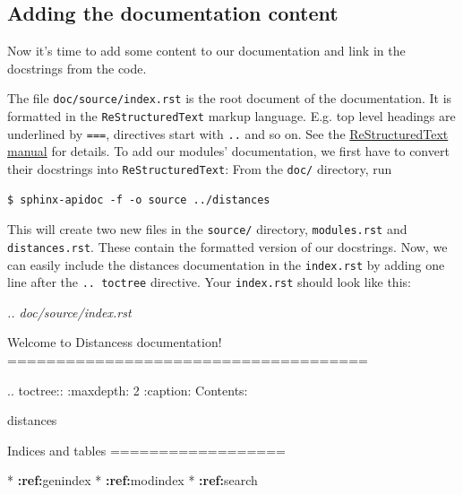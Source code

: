\documentclass[11pt]{article}
\newenvironment{Shaded}{}{}
\newcommand{\KeywordTok}[1]{\textcolor[rgb]{0.00,0.44,0.13}{\textbf{{#1}}}}
\newcommand{\DataTypeTok}[1]{\textcolor[rgb]{0.56,0.13,0.00}{{#1}}}
\newcommand{\DecValTok}[1]{\textcolor[rgb]{0.25,0.63,0.44}{{#1}}}
\newcommand{\CommentTok}[1]{\textcolor[rgb]{0.38,0.63,0.69}{\textit{{#1}}}}
\newcommand{\FunctionTok}[1]{\textcolor[rgb]{0.02,0.16,0.49}{{#1}}}
\newcommand{\NormalTok}[1]{{#1}}
\begin{document}
\hypertarget{adding-the-documentation-content}{%
\subsection{Adding the documentation
content}\label{adding-the-documentation-content}}

Now it's time to add some content to our documentation and link in the
docstrings from the code.

The file \texttt{doc/source/index.rst} is the root document of the
documentation. It is formatted in the \texttt{ReStructuredText} markup
language. E.g. top level headings are underlined by \texttt{===},
directives start with \texttt{..} and so on. See the
\href{https://www.sphinx-doc.org/en/master/usage/restructuredtext/basics.html}{ReStructuredText
manual} for details. To add our modules' documentation, we first have to
convert their docstrings into \texttt{ReStructuredText}: From the
\texttt{doc/} directory, run

\begin{verbatim}
$ sphinx-apidoc -f -o source ../distances
\end{verbatim}

This will create two new files in the \texttt{source/} directory,
\texttt{modules.rst} and \texttt{distances.rst}. These contain the
formatted version of our docstrings. Now, we can easily include the
distances documentation in the \texttt{index.rst} by adding one line
after the \texttt{..\ toctree} directive. Your \texttt{index.rst} should
look like this:

\begin{Shaded}
\begin{Highlighting}[]
\CommentTok{.. doc/source/index.rst}

\NormalTok{Welcome to Distances\textquotesingle{}s documentation!}
\NormalTok{=====================================}

\DataTypeTok{.. toctree::}
   \FunctionTok{:maxdepth:}\NormalTok{ 2}
   \FunctionTok{:caption:}\NormalTok{ Contents:}

\NormalTok{   distances}


\NormalTok{Indices and tables}
\NormalTok{==================}

\NormalTok{* }\KeywordTok{:ref:}\DecValTok{\textasciigrave{}genindex\textasciigrave{}}
\NormalTok{* }\KeywordTok{:ref:}\DecValTok{\textasciigrave{}modindex\textasciigrave{}}
\NormalTok{* }\KeywordTok{:ref:}\DecValTok{\textasciigrave{}search\textasciigrave{}}
\end{Highlighting}
\end{Shaded}
\end{document}
